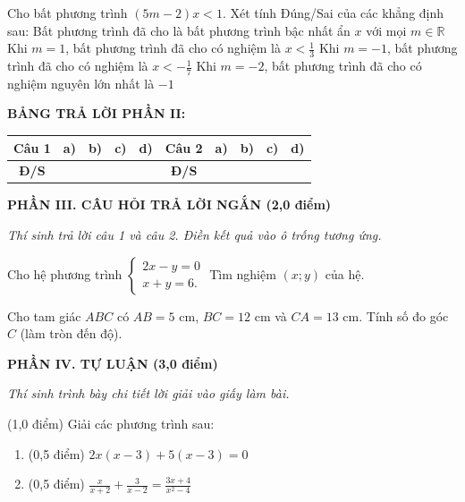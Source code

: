 \documentclass[12pt,a4paper]{article}
\begin{document}
\begin{ex}
Cho bất phương trình $(5m - 2)x < 1$. Xét tính Đúng/Sai của các khẳng định sau:
\choiceTF
{Bất phương trình đã cho là bất phương trình bậc nhất ẩn $x$ với mọi $m \in \mathbb{R}$}
{\True Khi $m = 1$, bất phương trình đã cho có nghiệm là $x < \frac{1}{3}$}
{Khi $m = -1$, bất phương trình đã cho có nghiệm là $x < -\frac{1}{7}$}
{Khi $m = -2$, bất phương trình đã cho có nghiệm nguyên lớn nhất là $-1$}
\end{ex}


\noindent\textbf{BẢNG TRẢ LỜI PHẦN II:}
\begin{center}
\begin{tabular}{|c|c|c|c|c||c|c|c|c|c|}
\hline
\textbf{Câu 1} & \textbf{a)} & \textbf{b)} & \textbf{c)} & \textbf{d)} & \textbf{Câu 2} & \textbf{a)} & \textbf{b)} & \textbf{c)} & \textbf{d)} \\
\hline
\textbf{Đ/S} & \rule{0pt}{0.6cm} & & & & \textbf{Đ/S} & & & & \\
\hline
\end{tabular}
\end{center}
\vspace{2mm}

\setcounter{ex}{0}
\noindent\textbf{\large PHẦN III. CÂU HỎI TRẢ LỜI NGẮN (2,0 điểm)}

\textit{Thí sinh trả lời câu 1 và câu 2. Điền kết quả vào ô trống tương ứng.}

\vspace{1mm}
\begin{ex}
Cho hệ phương trình $\begin{cases} 2x - y = 0 \\ x + y = 6. \end{cases}$ Tìm nghiệm $(x; y)$ của hệ. 
\end{ex}

\begin{ex}
Cho tam giác $ABC$ có $AB = 5\text{ cm}$, $BC = 12\text{ cm}$ và $CA = 13\text{ cm}$. Tính số đo góc $C$ (làm tròn đến độ). 
\end{ex}


\setcounter{ex}{0}
\noindent\textbf{\large PHẦN IV. TỰ LUẬN (3,0 điểm)}

\textit{Thí sinh trình bày chi tiết lời giải vào giấy làm bài.}

\vspace{1mm}
\begin{ex} (1,0 điểm)
Giải các phương trình sau:
\begin{enumerate}[label=\textbf{\alph*)}, leftmargin=0.8cm, itemsep=2pt]
\item (0,5 điểm) $2x(x - 3) + 5(x - 3) = 0$
\item (0,5 điểm) $\frac{x}{x + 2} + \frac{3}{x - 2} = \frac{3x + 4}{x^2 - 4}$
\end{enumerate}
\end{ex}
\vspace{0.5mm}
\end{document}
